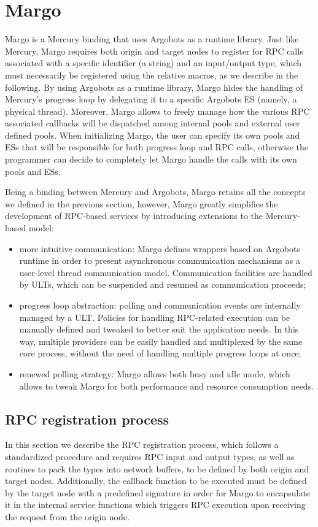 \section{Margo}
\label{sec:margo}
Margo \cite{mochi-core} is a Mercury binding that uses Argobots as a runtime library. Just like Mercury, Margo requires both origin and target nodes to register for RPC calls associated with a specific identifier (a string) and an input/output type, which must necessarily be registered using the relative macros, as we describe in the following.\newline
By using Argobots as a runtime library, Margo hides the handling of Mercury's progress loop by delegating it to a specific Argobots ES (namely, a physical thread). Moreover, Margo allows to freely manage how the various RPC associated callbacks will be dispatched among internal pools and external user defined pools. When initializing Margo, the user can specify its own pools and ESs that will be responsible for both progress loop and RPC calls, otherwise the programmer can decide to completely let Margo handle the calls with its own pools and ESs.\newline

Being a binding between Mercury and Argobots, Margo retains all the concepts we defined in the previous section, however, Margo greatly simplifies the development of RPC-based services by introducing extensions to the Mercury-based model:
\begin{itemize}
    \item more intuitive communication: Margo defines wrappers based on Argobots runtime in order to present asynchronous communication mechanisms as a user-level thread communication model. Communication facilities are handled by ULTs, which can be suspended and resumed as communication proceeds;
    \item progress loop abstraction: polling and communication events are internally managed by a ULT. Policies for handling RPC-related execution can be manually defined and tweaked to better suit the application needs. In this way, multiple providers can be easily handled and multiplexed by the same core process, without the need of handling multiple progress loops at once;
    \item renewed polling strategy: Margo allows both busy and idle mode, which allows to tweak Margo for both performance and resource consumption needs.
\end{itemize}
\subsection{RPC registration process}
\label{sec:rpc-reg}
In this section we describe the RPC registration process, which follows a standardized procedure and requires RPC input and output types, as well as routines to pack the types into network buffers, to be defined by both origin and target nodes. Additionally, the callback function to be executed must be defined by the target node with a predefined signature in order for Margo to encapsulate it in the internal service functions which triggers RPC execution upon receiving the request from the origin node.\newline

